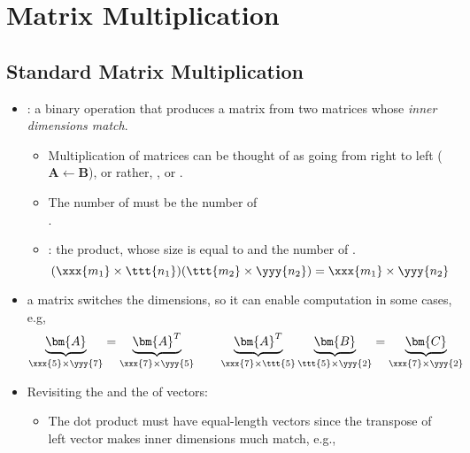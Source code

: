 \chapter{Matrix Multiplication}\label{Matrix Multiplication}
\section{Standard Matrix Multiplication}\label{Standard Matrix Multiplication}
\begin{itemize}
  \item {}: a binary operation that produces a matrix from two matrices whose \emph{inner dimensions match}.
    \begin{itemize}
      \item Multiplication of matrices can be thought of as going from right to left (\(\bm{A}\leftarrow\bm{B}\)), or rather, , or .
      \item The number of  must be  the number of \\ .
      \item {}: the product, whose size is equal to  and the number of .
      \[%
      (\xxx{m_1} \times \ttt{n_1})(\ttt{m_2} \times \yyy{n_2}) = \xxx{m_1} \times \yyy{n_2}
      \]%
    \end{itemize}
  \item \hyperref[Transposition]{} a matrix switches the dimensions, so it can enable computation in some cases, e.g,
  \[%
  \underbrace{\bm{A}}_{\xxx{5}\times \yyy{7}} = \underbrace{\bm{A}^T}_{\xxx{7}\times \yyy{5}} 
  \qquad
  \underbrace{\bm{A}^T}_{\xxx{7}\times \ttt{5}} 
  \underbrace{\bm{B}}_{\ttt{5}\times \yyy{2}} = \underbrace{\bm{C}}_{\xxx{7}\times\yyy{2}} 
  \]%
  \item Revisiting the \hyperref[The Dot Product]{} and the \hyperref[Outer Product]{} of vectors:
  \begin{itemize}
    \item The dot product must have equal-length vectors since the transpose of left vector makes inner dimensions much match, e.g.,

\end{itemize}
\end{itemize}
